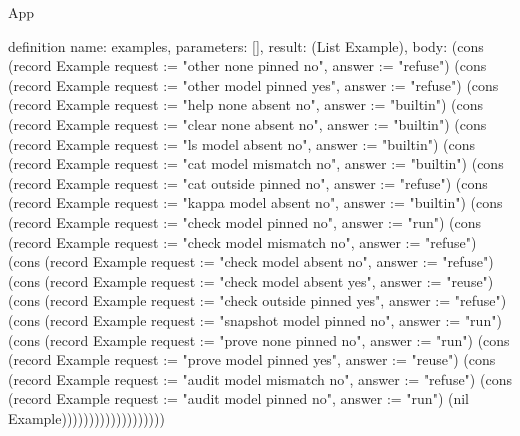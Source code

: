 \begin{lexlean}{App}
\begin{semanticmodule}
definition{
  name: examples,
  parameters: [],
  result: (List Example),
  body: (cons (record Example {request := "other none pinned no", answer := "refuse"}) (cons (record Example {request := "other model pinned yes", answer := "refuse"}) (cons (record Example {request := "help none absent no", answer := "builtin"}) (cons (record Example {request := "clear none absent no", answer := "builtin"}) (cons (record Example {request := "ls model absent no", answer := "builtin"}) (cons (record Example {request := "cat model mismatch no", answer := "builtin"}) (cons (record Example {request := "cat outside pinned no", answer := "refuse"}) (cons (record Example {request := "kappa model absent no", answer := "builtin"}) (cons (record Example {request := "check model pinned no", answer := "run"}) (cons (record Example {request := "check model mismatch no", answer := "refuse"}) (cons (record Example {request := "check model absent no", answer := "refuse"}) (cons (record Example {request := "check model absent yes", answer := "reuse"}) (cons (record Example {request := "check outside pinned yes", answer := "refuse"}) (cons (record Example {request := "snapshot model pinned no", answer := "run"}) (cons (record Example {request := "prove none pinned no", answer := "run"}) (cons (record Example {request := "prove model pinned yes", answer := "reuse"}) (cons (record Example {request := "audit model mismatch no", answer := "refuse"}) (cons (record Example {request := "audit model pinned no", answer := "run"}) (nil Example)))))))))))))))))))
}
\end{semanticmodule}
\end{lexlean}
